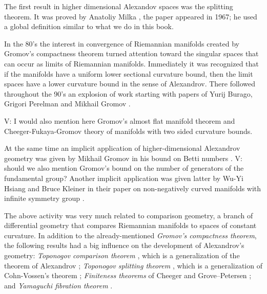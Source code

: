 The first result in higher dimensional Alexandov spaces was the splitting theorem.
It was proved by Anatoliy Milka \cite{milka-line}, the paper appeared in 1967;
he used a global definition similar to what we do in this book.

In the 80's the interest in convergence of Riemannian manifolds created by Gromov's compactness theorem \cite{gromov-precompactness} turned attention toward the singular spaces that can occur as limits of Riemannian manifolds.
Immediately it was recognized that if the manifolds have a uniform lower sectional curvature bound, then the limit spaces have a lower curvature bound in the sense of Alexandrov. 
There followed throughout the 90's an explosion of work starting with papers of Yurij Burago, Grigori Perelman and Mikhail Gromov  \cite{BGP,perelman:spaces2}.

{\color{red} V: I would also mention here Gromov's almost flat manifold theorem and Cheeger-Fukaya-Gromov theory of manifolds with two sided curvature bounds.}

At the same time an implicit application of higher-dimensional Alexandrov geometry was given by Mikhail Gromov in his bound on Betti numbers \cite{gromov:betti}.
{\color{red} V:  should we also mention Gromov's bound on the number of generators of the fundamental group?}
Another implicit application was given latter by Wu-Yi Hsiang and Bruce Kleiner in their paper on non-negatively curved manifolds with infinite symmetry group \cite{hsiang-kleiner}.

The above activity was very much related to comparison geometry,
a branch of differential geometry that compares Riemannian manifolds  to  spaces of constant curvature.
In addition to the already-mentioned \emph{Gromov's compactness theorem},
the following results had a big influence on the development of Alexandrov's geometry:
\emph{Toponogov comparison theorem} \cite{toponogov-globalization+splitting}, which is a generalization of the theorem of Alexandrov \cite{alexandrov-comparison};
\emph{Toponogov splitting theorem} \cite{toponogov-globalization+splitting}, which is a generalization of Cohn-Vossen's theorem \cite{cohn-vossen_line};
\emph{Finiteness theorems} of
Cheeger and
Grove--Petersen \cite{cheeger-finiteness,grove-petersen:finiteness};
and 
\emph{Yamaguchi fibration theorem} \cite{yamaguchi-fibration}.


